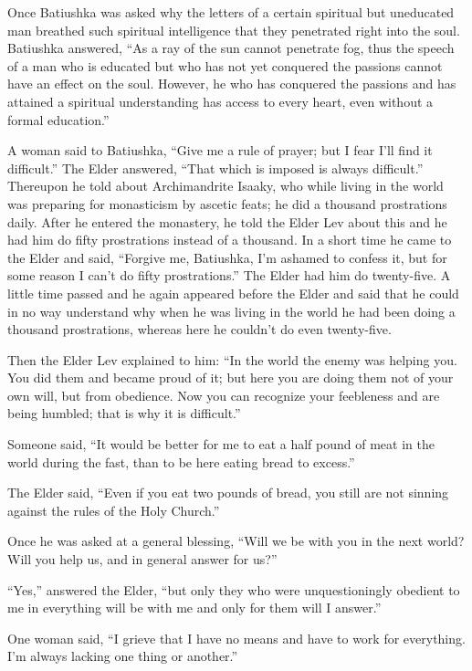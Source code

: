 Once Batiushka was asked why the letters of a certain spiritual but uneducated man breathed such spiritual intelligence that they penetrated right into the soul. Batiushka answered, ``As a ray of the sun cannot penetrate fog, thus the speech of a man who is educated but who has not yet conquered the passions cannot have an effect on the soul. However, he who has conquered the passions and has attained a spiritual understanding has access to every heart, even without a formal education.''

A woman said to Batiushka, ``Give me a rule of prayer; but I fear I'll find it difficult.'' The Elder answered, ``That which is imposed is always difficult.'' Thereupon he told about Archimandrite Isaaky, who while living in the world was preparing for monasticism by ascetic feats; he did a thousand prostrations daily. After he entered the monastery, he told the Elder Lev about this and he had him do fifty prostrations instead of a thousand. In a short time he came to the Elder and said, ``Forgive me, Batiushka, I'm ashamed to confess it, but for some reason I can't do fifty prostrations.'' The Elder had him do twenty-five. A little time passed and he again appeared before the Elder and said that he could in no way understand why when he was living in the world he had been doing a thousand prostrations, whereas here he couldn't do even twenty-five.

Then the Elder Lev explained to him: ``In the world the enemy was helping you. You did them and became proud of it; but here you are doing them not of your own will, but from obedience. Now you can recognize your feebleness and are being humbled; that is why it is difficult.''

Someone said, ``It would be better for me to eat a half pound of meat in the world during the fast, than to be here eating bread to excess.''

The Elder said, ``Even if you eat two pounds of bread, you still are not sinning against the rules of the Holy Church.''

Once he was asked at a general blessing, ``Will we be with you in the next world? Will you help us, and in general answer for us?''

``Yes,'' answered the Elder, ``but only they who were unquestioningly obedient to me in everything will be with me and only for them will I answer.''

One woman said, ``I grieve that I have no means and have to work for everything. I'm always lacking one thing or another.''

